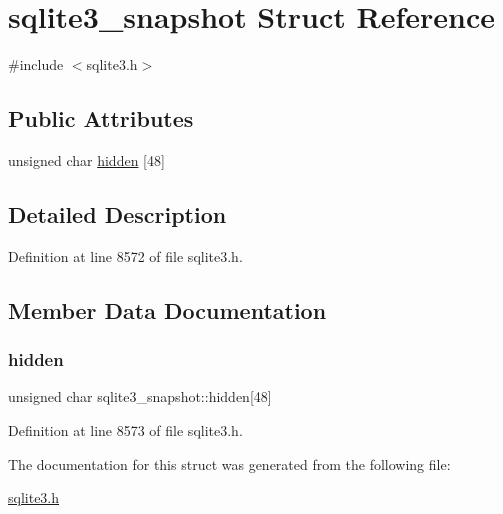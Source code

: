 \hypertarget{structsqlite3__snapshot}{}\section{sqlite3\+\_\+snapshot Struct Reference}
\label{structsqlite3__snapshot}


{\ttfamily \#include $<$sqlite3.\+h$>$}

\subsection*{Public Attributes}
\begin{DoxyCompactItemize}
\item 
unsigned char \mbox{\hyperlink{structsqlite3__snapshot_aeed328b50a9580e9a91d0bf10612be4e}{hidden}} \mbox{[}48\mbox{]}
\end{DoxyCompactItemize}


\subsection{Detailed Description}


Definition at line 8572 of file sqlite3.\+h.



\subsection{Member Data Documentation}
\mbox{\label{structsqlite3__snapshot_aeed328b50a9580e9a91d0bf10612be4e}} 
\subsubsection{\texorpdfstring{hidden}{hidden}}
{\footnotesize\ttfamily unsigned char sqlite3\+\_\+snapshot\+::hidden\mbox{[}48\mbox{]}}



Definition at line 8573 of file sqlite3.\+h.



The documentation for this struct was generated from the following file\+:\begin{DoxyCompactItemize}
\item 
\mbox{\hyperlink{sqlite3_8h}{sqlite3.\+h}}\end{DoxyCompactItemize}

